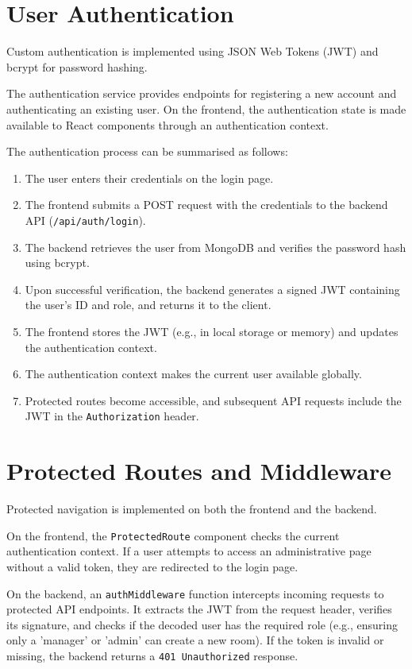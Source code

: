 \section{User Authentication}

Custom authentication is implemented using JSON Web Tokens (JWT) and bcrypt for password hashing.

The authentication service provides endpoints for registering a new account and authenticating an existing user. On the frontend, the authentication state is made available to React components through an authentication context.

The authentication process can be summarised as follows:

\begin{enumerate}
    \item The user enters their credentials on the login page.
    \item The frontend submits a POST request with the credentials to the backend API (\texttt{/api/auth/login}).
    \item The backend retrieves the user from MongoDB and verifies the password hash using bcrypt.
    \item Upon successful verification, the backend generates a signed JWT containing the user's ID and role, and returns it to the client.
    \item The frontend stores the JWT (e.g., in local storage or memory) and updates the authentication context.
    \item The authentication context makes the current user available globally.
    \item Protected routes become accessible, and subsequent API requests include the JWT in the \texttt{Authorization} header.
\end{enumerate}

\section{Protected Routes and Middleware}

Protected navigation is implemented on both the frontend and the backend.

On the frontend, the \texttt{ProtectedRoute} component checks the current authentication context. If a user attempts to access an administrative page without a valid token, they are redirected to the login page.

On the backend, an \texttt{authMiddleware} function intercepts incoming requests to protected API endpoints. It extracts the JWT from the request header, verifies its signature, and checks if the decoded user has the required role (e.g., ensuring only a 'manager' or 'admin' can create a new room). If the token is invalid or missing, the backend returns a \texttt{401 Unauthorized} response.

